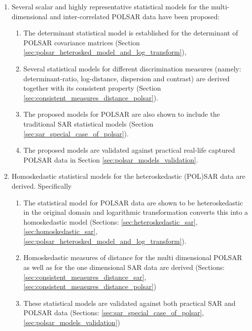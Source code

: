 \begin{enumerate}
\item           Several scalar and highly representative statistical models
                for the multi-dimensional and inter-correlated POLSAR
                data have been proposed:
                \begin{enumerate}
                \item The determinant statistical model is established for the determinant of POLSAR covariance matrices (Section \ref{sec:polsar_heterosked_model_and_log_transform}),
                \item Several statistical models for different discrimination measures (namely: determinant-ratio, log-distance, dispersion and contrast) are derived together with its consistent property (Section \ref{sec:consistent_measures_distance_polsar}). %
                \item The proposed models for POLSAR are also shown to include the traditional SAR statistical models (Section \ref{sec:sar_special_case_of_polsar}).
                \item \label{itm:polsar_validation} The proposed models are validated against practical real-life
                captured POLSAR data in Section \ref{sec:polsar_models_validation}.
                \end{enumerate}
\item                Homoskedastic statistical models for the
                heteroskedastic (POL)SAR data are derived. Specifically 
                \begin{enumerate}
                \item \label{itm:log_transform} The statistical model for POLSAR data are shown to be heteroskedastic in
                the original domain and logarithmic transformation
                converts this into a homoskedastic model (Sections: \ref{sec:heteroskedastic_sar}, \ref{sec:homoskedastic_sar}, \ref{sec:polsar_heterosked_model_and_log_transform}).
                \item \label{itm:sar_measures_distance} Homoskedastic measures of distance for
                the multi dimensional POLSAR as well as for the one
                dimensional SAR data are derived (Sections: \ref{sec:consistent_measures_distance_sar}, \ref{sec:consistent_measures_distance_polsar})
                \item \label{itm:sar_validation} These statistical models are validated against both
                practical SAR and POLSAR data (Sections: \ref{sec:sar_special_case_of_polsar}, \ref{sec:polsar_models_validation})

\end{enumerate}
\end{enumerate}
